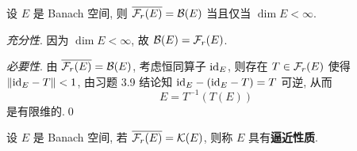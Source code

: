 \begin{Proposition}
	设 $ E $ 是 Banach 空间, 则 $ \overline{\mathcal{F}_{r}(E)}=\mathcal{B}(E) $ 当且仅当 $ \dim E<\infty $.
\end{Proposition}
\begin{Proof}
	\textsl{充分性}. 因为 $ \dim E<\infty $, 故 $ \mathcal{B}(E)=\mathcal{F}_{r}(E) $.

	\textsl{必要性}. 由 $ \overline{\mathcal{F}_{r}(E)}=\mathcal{B}(E) $, 考虑恒同算子 $ \mathrm{id}_{E} $, 则存在 $ T\in\mathcal{F}_{r}(E) $ 使得 $ \left\| \mathrm{id}_{E}-T \right\|<1 $, 由习题 3.9 结论知 $ \mathrm{id}_{E}-(\mathrm{id}_{E}-T)=T $ 可逆, 从而
	\[
		E = T^{-1}(T(E))
	\]
	是有限维的.\qed
\end{Proof}

\begin{Definition}[逼近性质]\label{def:逼近性质}
	设 $ E $ 是 Banach 空间, 若 $ \overline{\mathcal{F}_{r}(E)}=\mathcal{K}(E) $, 则称 $ E $ 具有\textbf{逼近性质}.
\end{Definition}

